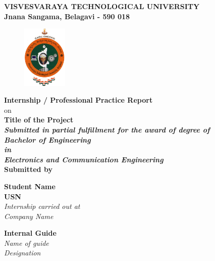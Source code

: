 
\begin{titlingpage}
\thispagestyle{empty}\centering

\setlength{\toptafiddle}{1in}
\setlength{\bottafiddle}{1in}
\vspace*{-1.25in}
\enlargethispage{\toptafiddle}
\large 
\textbf{VISVESVARAYA TECHNOLOGICAL UNIVERSITY\\
	Jnana Sangama, Belagavi - 590 018}\\
\vspace{0.2cm}
\begin{figure}[h]
\centering
\includegraphics[height=3cm]{images/vtu.png}
\end{figure}
\textbf{\color{red}Internship / Professional Practice Report}\\
{\color{red}on}\\

\Large{\textbf{\color{blue}Title of the Project}}\\
\small{\textit{\textbf{\color{red}Submitted in partial fulfillment for the award of degree of}}}\\

\vspace{0.2cm}
\textit{\textbf{\color{blue}Bachelor of Engineering\\ in \\Electronics and Communication Engineering}}
\vspace{0.5cm}\\
\textbf{Submitted by}


\begin{center}
	\Large\textbf{\color{blue}Student Name}\\
	\Large\textbf{\color{blue}USN}\\
		
	\textit{\color{red}Internship carried out at}\\
	
	\textit{\color{blue}Company Name}\\
\end{center}
\vspace{0.3cm}

	\begin{minipage}[t]{0.3\textwidth}%
	\Large\textbf{Internal Guide}\\
	\centering\large\textit{\color{blue}Name of guide}\\
	\centering\large\textit{\color{blue}Designation}\\
	

\end{minipage}
\end{titlingpage}
